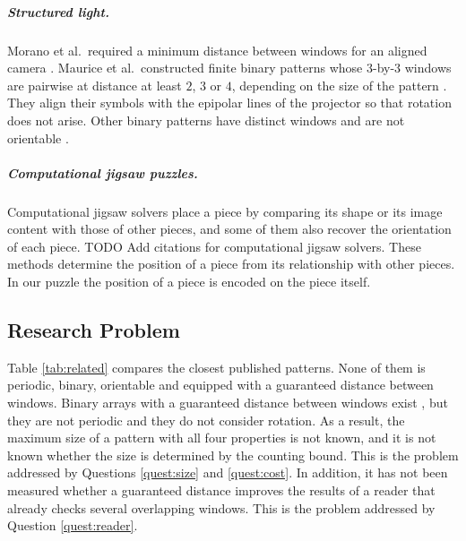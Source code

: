 \documentclass{lipics-v2021}
\newcommand{\todo}[1]{{\color{blue}TODO #1}}
\begin{document}
\subparagraph*{Structured light.}
Morano et al.\ required a minimum distance between windows for an aligned camera \cite{morano1998structured}.
Maurice et al.\ constructed finite binary patterns whose $3$-by-$3$ windows are pairwise at distance at least $2$, $3$ or $4$, depending on the size of the pattern \cite{maurice2011pattern}.
They align their symbols with the epipolar lines of the projector so that rotation does not arise.
Other binary patterns have distinct windows and are not orientable \cite{xu2007robust}.

\subparagraph*{Computational jigsaw puzzles.}
Computational jigsaw solvers place a piece by comparing its shape or its image content with those of other pieces, and some of them also recover the orientation of each piece.
\todo{Add  citations for computational jigsaw solvers.}
These methods determine the position of a piece from its relationship with other pieces.
In our puzzle the position of a piece is encoded on the piece itself.

\subsection{Research Problem}
\label{sec:background_problem}

Table \ref{tab:related} compares the closest published patterns.
None of them is periodic, binary, orientable and equipped with a guaranteed distance between windows.
Binary arrays with a guaranteed distance between windows exist \cite{chee2022robust,maurice2011pattern}, but they are not periodic and they do not consider rotation.
As a result, the maximum size of a pattern with all four properties is not known, and it is not known whether the size is determined by the counting bound.
This is the problem addressed by Questions \ref{quest:size} and \ref{quest:cost}.
In addition, it has not been measured whether a guaranteed distance improves the results of a reader that already checks several overlapping windows.
This is the problem addressed by Question \ref{quest:reader}.
\end{document}
